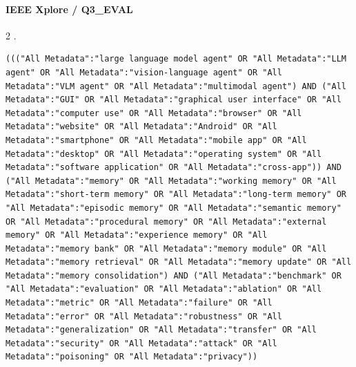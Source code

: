 \noindent\begin{minipage}{\linewidth}
\paragraph{IEEE Xplore / Q3\_EVAL}
2 .
\begin{lstlisting}
((("All Metadata":"large language model agent" OR "All Metadata":"LLM agent" OR "All Metadata":"vision-language agent" OR "All Metadata":"VLM agent" OR "All Metadata":"multimodal agent") AND ("All Metadata":"GUI" OR "All Metadata":"graphical user interface" OR "All Metadata":"computer use" OR "All Metadata":"browser" OR "All Metadata":"website" OR "All Metadata":"Android" OR "All Metadata":"smartphone" OR "All Metadata":"mobile app" OR "All Metadata":"desktop" OR "All Metadata":"operating system" OR "All Metadata":"software application" OR "All Metadata":"cross-app")) AND ("All Metadata":"memory" OR "All Metadata":"working memory" OR "All Metadata":"short-term memory" OR "All Metadata":"long-term memory" OR "All Metadata":"episodic memory" OR "All Metadata":"semantic memory" OR "All Metadata":"procedural memory" OR "All Metadata":"external memory" OR "All Metadata":"experience memory" OR "All Metadata":"memory bank" OR "All Metadata":"memory module" OR "All Metadata":"memory retrieval" OR "All Metadata":"memory update" OR "All Metadata":"memory consolidation") AND ("All Metadata":"benchmark" OR "All Metadata":"evaluation" OR "All Metadata":"ablation" OR "All Metadata":"metric" OR "All Metadata":"failure" OR "All Metadata":"error" OR "All Metadata":"robustness" OR "All Metadata":"generalization" OR "All Metadata":"transfer" OR "All Metadata":"security" OR "All Metadata":"attack" OR "All Metadata":"poisoning" OR "All Metadata":"privacy"))
\end{lstlisting}
\end{minipage}\par\medskip
